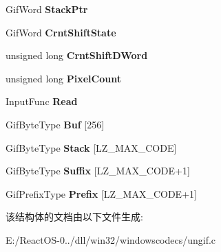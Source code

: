 \begin{DoxyCompactItemize}
Gif\+Word {\bfseries Stack\+Ptr}
\item 
\mbox{\label{struct_gif_file_private_type_a522dbf49752e62557383c97ff3e4cf0a}} 
Gif\+Word {\bfseries Crnt\+Shift\+State}
\item 
\mbox{\label{struct_gif_file_private_type_afbb64af74cb590402e06485e2570e1a9}} 
unsigned long {\bfseries Crnt\+Shift\+D\+Word}
\item 
\mbox{\label{struct_gif_file_private_type_a424ba36c6db6bc3951b906ea8b59be8e}} 
unsigned long {\bfseries Pixel\+Count}
\item 
\mbox{\label{struct_gif_file_private_type_a43d6292f13974ae87849b37704a492c7}} 
Input\+Func {\bfseries Read}
\item 
\mbox{\label{struct_gif_file_private_type_a8baee422f18b41efd6f22591f0493713}} 
Gif\+Byte\+Type {\bfseries Buf} \mbox{[}256\mbox{]}
\item 
\mbox{\label{struct_gif_file_private_type_a1fdc38f1d6522abf4eb630f46201666d}} 
Gif\+Byte\+Type {\bfseries Stack} \mbox{[}L\+Z\+\_\+\+M\+A\+X\+\_\+\+C\+O\+DE\mbox{]}
\item 
\mbox{\label{struct_gif_file_private_type_a5212c7688f78c9f20656a23c988e9ce5}} 
Gif\+Byte\+Type {\bfseries Suffix} \mbox{[}L\+Z\+\_\+\+M\+A\+X\+\_\+\+C\+O\+DE+1\mbox{]}
\item 
\mbox{\label{struct_gif_file_private_type_ab42660061df887c506733e1258c2ac24}} 
Gif\+Prefix\+Type {\bfseries Prefix} \mbox{[}L\+Z\+\_\+\+M\+A\+X\+\_\+\+C\+O\+DE+1\mbox{]}
\end{DoxyCompactItemize}


该结构体的文档由以下文件生成\+:\begin{DoxyCompactItemize}
\item 
E\+:/\+React\+O\+S-\/0../dll/win32/windowscodecs/ungif.\+c\end{DoxyCompactItemize}
